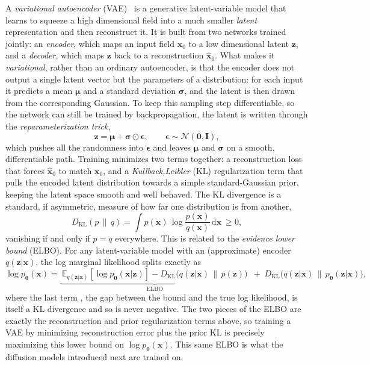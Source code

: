 A \emph{variational autoencoder} (VAE)~\citep{kingma_auto-encoding_2022} is a generative latent-variable model that learns to squeeze a high dimensional field into a much smaller \emph{latent} representation and then reconstruct it. It is built from two networks trained jointly: an \emph{encoder}, which maps an input field $\bm{x}_0$ to a low dimensional latent $\bm{z}$, and a \emph{decoder}, which maps $\bm{z}$ back to a reconstruction $\hat{\bm{x}}_0$. What makes it \emph{variational}, rather than an ordinary autoencoder, is that the encoder does not output a single latent vector but the parameters of a distribution: for each input it predicts a mean $\bm{\mu}$ and a standard deviation $\bm{\sigma}$, and the latent is then drawn from the corresponding Gaussian. To keep this sampling step differentiable, so the network can still be trained by backpropagation, the latent is written through the \emph{reparameterization trick},
\begin{equation}
    \bm{z} = \bm{\mu} + \bm{\sigma}\odot\bm{\epsilon}, \qquad \bm{\epsilon}\sim\mathcal{N}(\bm{0},\mathbf{I}),
    \label{eq:vae_reparam}
\end{equation}
which pushes all the randomness into $\bm{\epsilon}$ and leaves $\bm{\mu}$ and $\bm{\sigma}$ on a smooth, differentiable path. Training minimizes two terms together: a reconstruction loss that forces $\hat{\bm{x}}_0$ to match $\bm{x}_0$, and a \emph{Kullback,Leibler} (KL) regularization term that pulls the encoded latent distribution towards a simple standard-Gaussian prior, keeping the latent space smooth and well behaved. The KL divergence is a standard, if asymmetric, measure of how far one distribution is from another,
\begin{equation}
\label{eq:kl_div}
    D_{\mathrm{KL}}(p\,\|\,q) = \int p(\bm{x})\,\log\frac{p(\bm{x})}{q(\bm{x})}\,\text{d}\bm{x} \ \geq 0,
\end{equation}
vanishing if and only if $p=q$ everywhere. This is related to the \emph{evidence lower bound} (ELBO). For any latent-variable model with an (approximate) encoder $q(\bm{z}|\bm{x})$, the log marginal likelihood splits exactly as
\begin{equation}
\label{eq:elbo}
    \log p_{\bm\theta}(\bm{x}) = \underbrace{\ \mathbb{E}_{q(\bm{z}|\bm{x})}\!\left[\log p_{\bm\theta}(\bm{x}|\bm{z})\right] - D_{\mathrm{KL}}\!\big(q(\bm{z}|\bm{x})\,\|\,p(\bm{z})\big)\ }_{\text{ELBO}} \;+\; D_{\mathrm{KL}}\!\big(q(\bm{z}|\bm{x})\,\|\,p_{\bm\theta}(\bm{z}|\bm{x})\big),
\end{equation}
where the last term , the gap between the bound and the true log likelihood, is itself a KL divergence and so is never negative. The two pieces of the ELBO are exactly the reconstruction and prior regularization terms above, so training a VAE by minimizing reconstruction error plus the prior KL is precisely maximizing this lower bound on $\log p_{\bm\theta}(\bm{x})$. This same ELBO is what the diffusion models introduced next are trained on.

